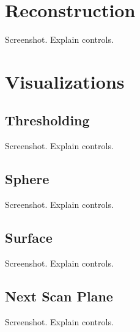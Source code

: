 \clearpage
\section{Reconstruction}\label{implementation:reconstruction}
Screenshot. Explain controls.

\clearpage
\section{Visualizations}\label{implementation:visualizations}

\subsection{Thresholding}\label{implementation:thresholding}
Screenshot. Explain controls.

\subsection{Sphere}\label{implementation:sphere}
Screenshot. Explain controls.

\subsection{Surface}\label{implementation:surface}
Screenshot. Explain controls.

\subsection{Next Scan Plane}\label{implementation:nextscanplane}
Screenshot. Explain controls.